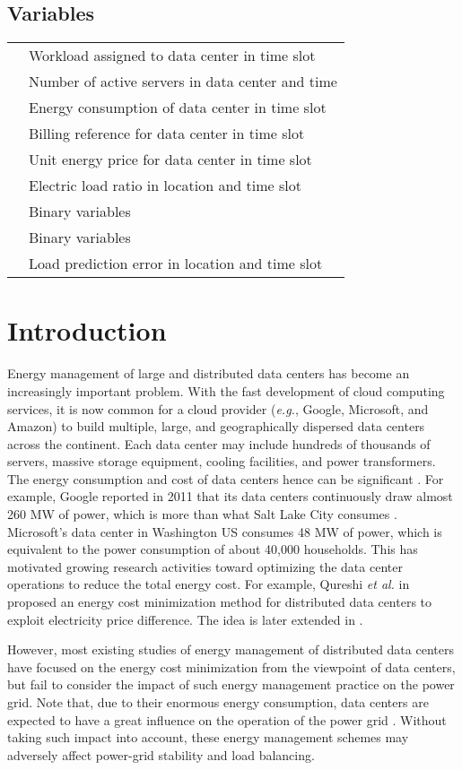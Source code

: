 \documentclass[journal]{IEEEtran}
\begin{document}
\subsection*{Variables}
\begin{tabular}{l l}  &Workload assigned to data center  in time slot \\
	 &Number of active servers in data center  and time \\ 
	 &Energy consumption of data center  in time slot \\ 
	 &Billing reference for data center  in time slot \\ 
	 &Unit energy price for data center  in time slot \\
	 &Electric load ratio in location  and time slot \\
	 &Binary variables \\
	 &Binary variables \\
	 &Load prediction error in location  and time slot 
\end{tabular}


	\section{Introduction}
	Energy management of large and distributed data centers has become an increasingly important problem. With the fast development of cloud computing services, it is now common for a cloud provider (\textit{e.g.}, Google, Microsoft, and Amazon) to build multiple, large, and geographically dispersed data centers across the continent. Each data center may include hundreds of thousands of servers, massive storage equipment, cooling facilities, and power transformers. The energy consumption and cost of data centers hence can be significant \cite{sigcomm}. For example, Google reported in 2011 that its data centers continuously draw almost 260 MW of power, which is more than what Salt Lake City consumes \cite{google}. Microsoft's data center in Washington US consumes 48 MW of power, which is equivalent to the power consumption of about 40,000 households. This has motivated growing research activities toward optimizing the data center operations to reduce the total energy cost. For example, Qureshi \emph{et al.} in \cite{sigcomm} proposed an energy cost minimization method for distributed data centers to exploit electricity price difference. The idea is later extended in \cite{infocom,sigmetrics,online,SLA,price,Auction,tradeoff}.
	
	However, most existing studies of energy management of distributed data centers have focused on the energy cost minimization from the viewpoint of data centers, but fail to consider the impact of such energy management practice on the power grid. Note that, due to their enormous energy consumption, data centers are expected to have a great influence on the operation of the power grid \cite{coordinate}. Without taking such impact into account, these energy management schemes may adversely affect power-grid stability and load balancing.
	
\end{document}
